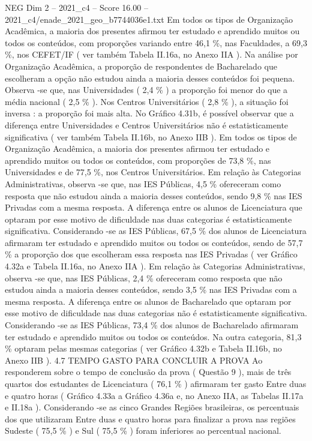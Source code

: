 \begin{textsample}{NEG Dim 2 – 2021\_c4 – Score 16.00 – 2021\_c4/enade\_2021\_geo\_b7744036e1.txt}
Em todos os tipos de Organização Acadêmica, a maioria dos presentes afirmou ter estudado e aprendido muitos ou todos os conteúdos, com proporções variando entre 46,1 \%, nas Faculdades, a 69,3 \%, nos CEFET/IF ( ver também Tabela II.16a, no Anexo IIA ).
Na análise por Organização Acadêmica, a proporção de respondentes de Bacharelado que escolheram a opção não estudou ainda a maioria desses conteúdos foi pequena.
Observa -se que, nas Universidades ( 2,4 \% ) a proporção foi menor do que a média nacional ( 2,5 \% ).
Nos Centros Universitários ( 2,8 \% ), a situação foi inversa : a proporção foi mais alta.
No Gráfico 4.31b, é possível observar que a diferença entre Universidades e Centros Universitários não é estatisticamente significativa ( ver também Tabela II.16b, no Anexo IIB ).
Em todos os tipos de Organização Acadêmica, a maioria dos presentes afirmou ter estudado e aprendido muitos ou todos os conteúdos, com proporções de 73,8 \%, nas Universidades e de 77,5 \%, nos Centros Universitários.
Em relação às Categorias Administrativas, observa -se que, nas IES Públicas, 4,5 \% ofereceram como resposta que não estudou ainda a maioria desses conteúdos, sendo 9,8 \% nas IES Privadas com a mesma resposta.
A diferença entre os alunos de Licenciatura que optaram por esse motivo de dificuldade nas duas categorias é estatisticamente significativa.
Considerando -se as IES Públicas, 67,5 \% dos alunos de Licenciatura afirmaram ter estudado e aprendido muitos ou todos os conteúdos, sendo de 57,7 \% a proporção dos que escolheram essa resposta nas IES Privadas ( ver Gráfico 4.32a e Tabela II.16a, no Anexo IIA ).
Em relação às Categorias Administrativas, observa -se que, nas IES Públicas, 2,4 \% ofereceram como resposta que não estudou ainda a maioria desses conteúdos, sendo 3,5 \% nas IES Privadas com a mesma resposta.
A diferença entre os alunos de Bacharelado que optaram por esse motivo de dificuldade nas duas categorias não é estatisticamente significativa.
Considerando -se as IES Públicas, 73,4 \% dos alunos de Bacharelado afirmaram ter estudado e aprendido muitos ou todos os conteúdos.
Na outra categoria, 81,3 \% optaram pelas mesmas categorias ( ver Gráfico 4.32b e Tabela II.16b, no Anexo IIB ). 4.7 TEMPO GASTO PARA CONCLUIR A PROVA Ao responderem sobre o tempo de conclusão da prova ( Questão 9 ), mais de três quartos dos estudantes de Licenciatura ( 76,1 \% ) afirmaram ter gasto Entre duas e quatro horas ( Gráfico 4.33a a Gráfico 4.36a e, no Anexo IIA, as Tabelas II.17a e II.18a ).
Considerando -se as cinco Grandes Regiões brasileiras, os percentuais dos que utilizaram Entre duas e quatro horas para finalizar a prova nas regiões Sudeste ( 75,5 \% ) e Sul ( 75,5 \% ) foram inferiores ao percentual nacional.

\end{textsample}

